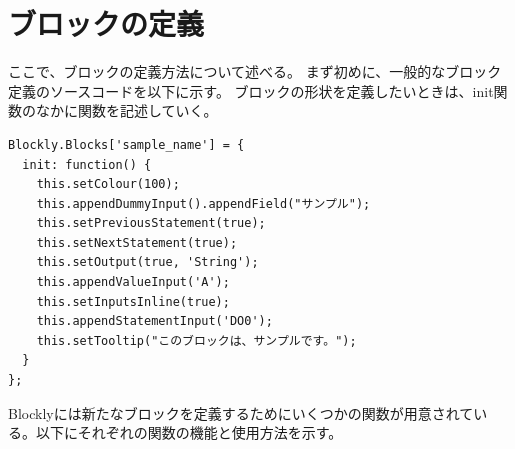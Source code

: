 \documentclass{risepaper}
\begin{document}
   \section{ブロックの定義}
   
ここで、ブロックの定義方法について述べる。
まず初めに、一般的なブロック定義のソースコードを以下に示す。
ブロックの形状を定義したいときは、init関数のなかに関数を記述していく。

\begin{lstlisting}[basicstyle=\ttfamily\footnotesize]
Blockly.Blocks['sample_name'] = {
  init: function() {
    this.setColour(100);
    this.appendDummyInput().appendField("サンプル");
    this.setPreviousStatement(true);
    this.setNextStatement(true);
    this.setOutput(true, 'String');
    this.appendValueInput('A');
    this.setInputsInline(true);
    this.appendStatementInput('DO0');
    this.setTooltip("このブロックは、サンプルです。");
  }
};
\end{lstlisting}

Blocklyには新たなブロックを定義するためにいくつかの関数が用意されている。以下にそれぞれの関数の機能と使用方法を示す。
\end{document}
